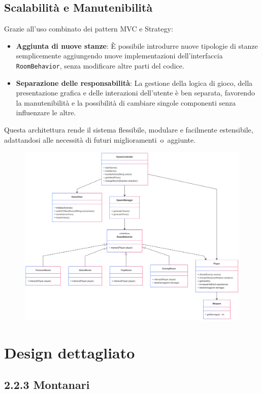 \documentclass[a4paper,12pt]{report}
\begin{document}
\subsection*{Scalabilità e Manutenibilità}
Grazie all'uso combinato dei pattern MVC e Strategy:
\begin{itemize}
    \item \textbf{Aggiunta di nuove stanze}: È possibile introdurre nuove tipologie di stanze semplicemente aggiungendo nuove implementazioni dell'interfaccia \texttt{RoomBehavior}, senza modificare altre parti del codice.
    \item \textbf{Separazione delle responsabilità}: La gestione della logica di gioco, della presentazione grafica e delle interazioni dell'utente è ben separata, favorendo la manutenibilità e la possibilità di cambiare singole componenti senza influenzare le altre.
\end{itemize}

Questa architettura rende il sistema flessibile, modulare e facilmente estensibile, adattandosi alle necessità di futuri miglioramenti o aggiunte.
%
\begin{figure}[H]
	\includegraphics[scale=0.12]{img/design.png}
\end{figure}

\section{Design dettagliato}
\subsection{2.2.3 Montanari}
\end{document}
